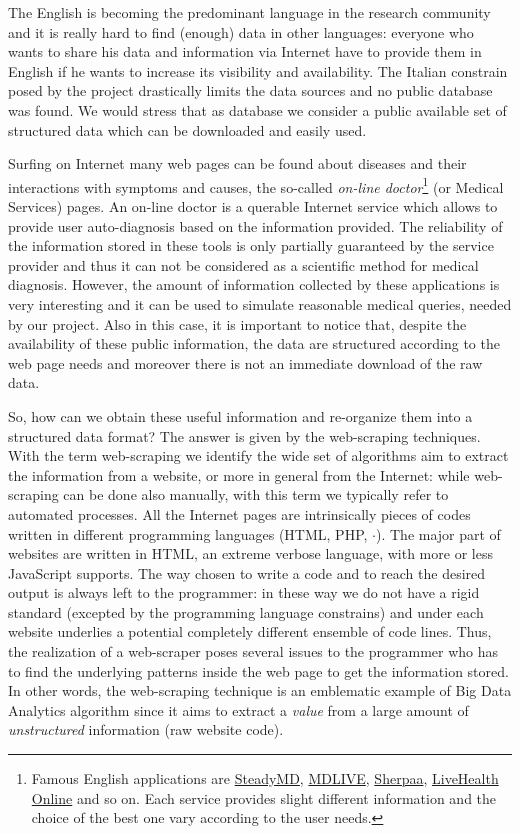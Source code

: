 \documentclass{standalone}
\begin{document}
The English is becoming the predominant language in the research community and it is really hard to find (enough) data in other languages: everyone who wants to share his data and information via Internet have to provide them in English if he wants to increase its visibility and availability.
The Italian constrain posed by the project drastically limits the data sources and no public database was found.
We would stress that as database we consider a public available set of structured data which can be downloaded and easily used.

Surfing on Internet many web pages can be found about diseases and their interactions with symptoms and causes, the so-called \emph{on-line doctor}\footnote{
  Famous English applications are \href{https://www.steadymd.com/?utm_source=bestonlinedoctors&utm_medium=partner&utm_campaign=bizdev}{SteadyMD}, \href{https://www.mdlive.com/}{MDLIVE}, \href{https://sherpaa.com/}{Sherpaa}, \href{https://livehealthonline.com/}{LiveHealth Online} and so on.
  Each service provides slight different information and the choice of the best one vary according to the user needs.
} (or Medical Services) pages.
An on-line doctor is a querable Internet service which allows to provide user auto-diagnosis based on the information provided.
The reliability of the information stored in these tools is only partially guaranteed by the service provider and thus it can not be considered as a scientific method for medical diagnosis.
However, the amount of information collected by these applications is very interesting and it can be used to simulate reasonable medical queries, needed by our project.
Also in this case, it is important to notice that, despite the availability of these public information, the data are structured according to the web page needs and moreover there is not an immediate download of the raw data.

So, how can we obtain these useful information and re-organize them into a structured data format?
The answer is given by the \textsf{web-scraping} techniques.
With the term \textsf{web-scraping} we identify the wide set of algorithms aim to extract the information from a website, or more in general from the Internet: while \textsf{web-scraping} can be done also manually, with this term we typically refer to automated processes.
All the Internet pages are intrinsically pieces of codes written in different programming languages (HTML, PHP, $\cdot$).
The major part of websites are written in HTML, an extreme verbose language, with more or less JavaScript supports.
The way chosen to write a code and to reach the desired output is always left to the programmer: in these way we do not have a rigid standard (excepted by the programming language constrains) and under each website underlies a potential completely different ensemble of code lines.
Thus, the realization of a web-scraper poses several issues to the programmer who has to find the underlying patterns inside the web page to get the information stored.
In other words, the \textsf{web-scraping} technique is an emblematic example of Big Data Analytics algorithm since it aims to extract a \emph{value} from a large amount of \emph{unstructured} information (raw website code).
\end{document}
